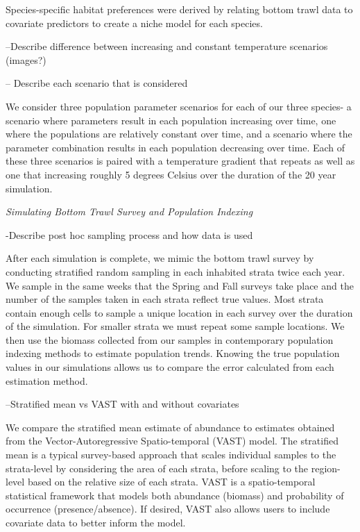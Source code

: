 \documentclass[
  12pt,
]{article}
\begin{document}
Species-specific habitat preferences were derived by relating bottom trawl data to covariate predictors to create a niche model for each species.

--Describe difference between increasing and constant temperature scenarios (images?)

-- Describe each scenario that is considered

We consider three population parameter scenarios for each of our three species- a scenario where parameters result in each population increasing over time, one where the populations are relatively constant over time, and a scenario where the parameter combination results in each population decreasing over time. Each of these three scenarios is paired with a temperature gradient that repeats as well as one that increasing roughly 5 degrees Celsius over the duration of the 20 year simulation.

\emph{Simulating Bottom Trawl Survey and Population Indexing}

-Describe post hoc sampling process and how data is used

After each simulation is complete, we mimic the bottom trawl survey by conducting stratified random sampling in each inhabited strata twice each year. We sample in the same weeks that the Spring and Fall surveys take place and the number of the samples taken in each strata reflect true values. Most strata contain enough cells to sample a unique location in each survey over the duration of the simulation. For smaller strata we must repeat some sample locations. We then use the biomass collected from our samples in contemporary population indexing methods to estimate population trends. Knowing the true population values in our simulations allows us to compare the error calculated from each estimation method.

--Stratified mean vs VAST with and without covariates

We compare the stratified mean estimate of abundance to estimates obtained from the Vector-Autoregressive Spatio-temporal (VAST) model. The stratified mean is a typical survey-based approach that scales individual samples to the strata-level by considering the area of each strata, before scaling to the region-level based on the relative size of each strata. VAST is a spatio-temporal statistical framework that models both abundance (biomass) and probability of occurrence (presence/absence). If desired, VAST also allows users to include covariate data to better inform the model.
\end{document}
